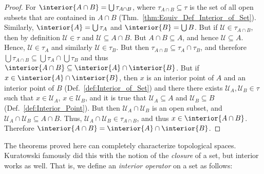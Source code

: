        \begin{proof}
            For $\interior{A\cap{B}}=\bigcup\tau_{A\cap{B}}$, where
            $\tau_{A\cap{B}}\subseteq\tau$ is the set of all open subsets
            that are contained in $A\cap{B}$
            (Thm.~\ref{thm:Equiv_Def_Interior_of_Set}). Similarly,
            $\interior{A}=\bigcup\tau_{A}$ and $\interior{B}=\bigcup{B}$.
            But if $\mathcal{U}\in\tau_{A\cap{B}}$, then by definition
            $\mathcal{U}\in\tau$ and $\mathcal{U}\subseteq{A}\cap{B}$.
            But $A\cap{B}\subseteq{A}$, and hence $\mathcal{U}\subseteq{A}$.
            Hence, $\mathcal{U}\in\tau_{A}$ and similarly
            $\mathcal{U}\in\tau_{B}$. But then
            $\tau_{A\cap{B}}\subseteq\tau_{A}\cap\tau_{B}$, and therefore
            $\bigcup\tau_{A\cap{B}}\subseteq\bigcup\tau_{A}\cap\bigcup\tau_{B}$
            and thus $\interior{A\cap{B}}\subseteq\interior{A}\cap\interior{B}$.
            But if $x\in\interior{A}\cap\interior{B}$, then $x$ is an
            interior point of $A$ and an interior point of $B$
            (Def.~\ref{def:Interior_of_Set}) and there there exists
            $\mathcal{U}_{A},\mathcal{U}_{B}\in\tau$ such that
            $x\in\mathcal{U}_{A}$, $x\in\mathcal{U}_{B}$, and it is true
            that $\mathcal{U}_{A}\subseteq{A}$ and
            $\mathcal{U}_{B}\subseteq{B}$ (Def.~\ref{def:Interior_Point}).
            But then $\mathcal{U}_{A}\cap\mathcal{U}_{B}$ is an open subset,
            and $\mathcal{U}_{A}\cap\mathcal{U}_{B}\subseteq{A}\cap{B}$.
            Thus, $\mathcal{U}_{A}\cap\mathcal{U}_{B}\in\tau_{A\cap{B}}$,
            and thus $x\in\interior{A\cap{B}}$. Therefore
            $\interior{A\cap{B}}=\interior{A}\cap\interior{B}$.
        \end{proof}
        The theorems proved here can completely characterize topological
        spaces. Kuratowski famously did this with the notion of the
        \textit{closure} of a set, but interior works as well. That is, we
        define an \textit{interior operator} on a set as follows:
